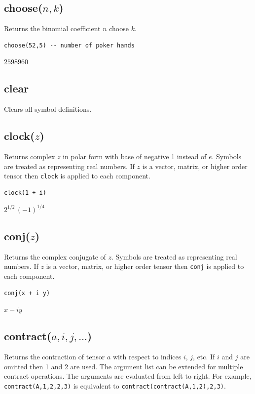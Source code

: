\documentclass[12pt]{article}
\begin{document}
\subsection*{choose($n,k$)}

Returns the binomial coefficient $n$ choose $k$.

{\color{blue}
\begin{verbatim}
choose(52,5) -- number of poker hands
\end{verbatim}
}

$2598960$

\subsection*{clear}

Clears all symbol definitions.

\subsection*{clock($z$)}

Returns complex $z$ in polar form with base of negative 1 instead of $e$.
Symbols are treated as representing real numbers.
If $z$ is a vector, matrix, or higher order tensor then
\verb$clock$ is applied to each component.

{\color{blue}
\begin{verbatim}
clock(1 + i)
\end{verbatim}
}

$2^{1/2}\,(-1)^{1/4}$

\subsection*{conj($z$)}

Returns the complex conjugate of $z$.
Symbols are treated as representing real numbers.
If $z$ is a vector, matrix, or higher order tensor then
\verb$conj$ is applied to each component.

{\color{blue}
\begin{verbatim}
conj(x + i y)
\end{verbatim}
}

$x - i y$

\subsection*{contract($a,i,j,\ldots$)}

Returns the contraction of tensor $a$ with respect to indices $i$, $j$, etc.
If $i$ and $j$ are omitted then 1 and 2 are used.
The argument list can be extended for multiple contract operations.
The arguments are evaluated from left to right.
For example, {\tt contract(A,1,2,2,3)} is equivalent to {\tt contract(contract(A,1,2),2,3)}.
\end{document}
